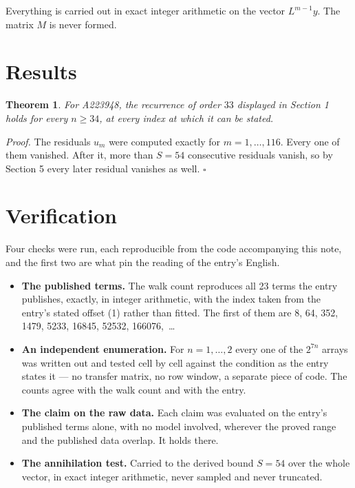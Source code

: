 \documentclass[11pt]{article}
\newtheorem{theorem}{Theorem}
\theoremstyle{definition}
\begin{document}
Everything is carried out in exact integer arithmetic on the vector $L^{m-1}y$. The matrix $M$ is never formed.

\section{Results}

\begin{theorem} For A223948, the recurrence of order $33$ displayed in Section 1 holds for every $n \ge 34$, at every index at which it can be stated.\end{theorem}

{\itshape Proof.} The residuals $u_m$ were computed exactly for $m = 1,\dots,116$. Every one of them vanished. After it, more than $S = 54$ consecutive residuals vanish, so by Section 5 every later residual vanishes as well. $\square$

\section{Verification}

Four checks were run, each reproducible from the code accompanying this note, and the first two are what pin the reading of the entry's English.

\begin{itemize}

\item {\bfseries The published terms.} The walk count reproduces all 23 terms the entry publishes, exactly, in integer arithmetic, with the index taken from the entry's stated offset (1) rather than fitted. The first of them are 8, 64, 352, 1479, 5233, 16845, 52532, 166076,~\dots

\item {\bfseries An independent enumeration.} For $n = 1,\dots,2$ every one of the $2^{7n}$ arrays was written out and tested cell by cell against the condition as the entry states it --- no transfer matrix, no row window, a separate piece of code. The counts agree with the walk count and with the entry.

\item {\bfseries The claim on the raw data.} Each claim was evaluated on the entry's published terms alone, with no model involved, wherever the proved range and the published data overlap. It holds there.

\item {\bfseries The annihilation test.} Carried to the derived bound $S = 54$ over the whole vector, in exact integer arithmetic, never sampled and never truncated.

\end{itemize}
\end{document}
